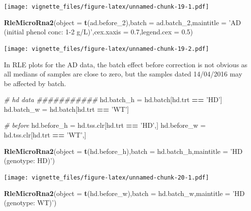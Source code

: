 \documentclass[]{book}
\newenvironment{Shaded}{\begin{snugshade}}{\end{snugshade}}
\newcommand{\KeywordTok}[1]{\textcolor[rgb]{0.13,0.29,0.53}{\textbf{#1}}}
\newcommand{\DataTypeTok}[1]{\textcolor[rgb]{0.13,0.29,0.53}{#1}}
\newcommand{\DecValTok}[1]{\textcolor[rgb]{0.00,0.00,0.81}{#1}}
\newcommand{\FloatTok}[1]{\textcolor[rgb]{0.00,0.00,0.81}{#1}}
\newcommand{\StringTok}[1]{\textcolor[rgb]{0.31,0.60,0.02}{#1}}
\newcommand{\CommentTok}[1]{\textcolor[rgb]{0.56,0.35,0.01}{\textit{#1}}}
\newcommand{\OperatorTok}[1]{\textcolor[rgb]{0.81,0.36,0.00}{\textbf{#1}}}
\newcommand{\NormalTok}[1]{#1}
\begin{document}
\texttt{[image: vignette\_files/figure-latex/unnamed-chunk-19-1.pdf]}

\begin{Shaded}
\begin{Highlighting}[]
\KeywordTok{RleMicroRna2}\NormalTok{(}\DataTypeTok{object =} \KeywordTok{t}\NormalTok{(ad.before_}\DecValTok{2}\NormalTok{),}\DataTypeTok{batch =}\NormalTok{ ad.batch_}\DecValTok{2}\NormalTok{,}\DataTypeTok{maintitle =} \StringTok{'AD (initial phenol conc: 1-2 g/L)'}\NormalTok{,}\DataTypeTok{cex.xaxis =} \FloatTok{0.7}\NormalTok{,}\DataTypeTok{legend.cex =} \FloatTok{0.5}\NormalTok{)}
\end{Highlighting}
\end{Shaded}

\texttt{[image: vignette\_files/figure-latex/unnamed-chunk-19-2.pdf]}

In RLE plots for the AD data, the batch effect before correction is not
obvious as all medians of samples are close to zero, but the samples
dated 14/04/2016 may be affected by batch.

\begin{Shaded}
\begin{Highlighting}[]
\CommentTok{# hd data ###########}
\NormalTok{hd.batch_h =}\StringTok{ }\NormalTok{hd.batch[hd.trt }\OperatorTok{==}\StringTok{ 'HD'}\NormalTok{]}
\NormalTok{hd.batch_w =}\StringTok{ }\NormalTok{hd.batch[hd.trt }\OperatorTok{==}\StringTok{ 'WT'}\NormalTok{] }

\CommentTok{# before}
\NormalTok{hd.before_h =}\StringTok{ }\NormalTok{hd.tss.clr[hd.trt }\OperatorTok{==}\StringTok{ 'HD'}\NormalTok{,]}
\NormalTok{hd.before_w =}\StringTok{ }\NormalTok{hd.tss.clr[hd.trt }\OperatorTok{==}\StringTok{ 'WT'}\NormalTok{,]}

\KeywordTok{RleMicroRna2}\NormalTok{(}\DataTypeTok{object =} \KeywordTok{t}\NormalTok{(hd.before_h),}\DataTypeTok{batch =}\NormalTok{ hd.batch_h,}\DataTypeTok{maintitle =} \StringTok{'HD (genotype: HD)'}\NormalTok{)}
\end{Highlighting}
\end{Shaded}

\texttt{[image: vignette\_files/figure-latex/unnamed-chunk-20-1.pdf]}

\begin{Shaded}
\begin{Highlighting}[]
\KeywordTok{RleMicroRna2}\NormalTok{(}\DataTypeTok{object =} \KeywordTok{t}\NormalTok{(hd.before_w),}\DataTypeTok{batch =}\NormalTok{ hd.batch_w,}\DataTypeTok{maintitle =} \StringTok{'HD (genotype: WT)'}\NormalTok{)}
\end{Highlighting}
\end{Shaded}
\end{document}

